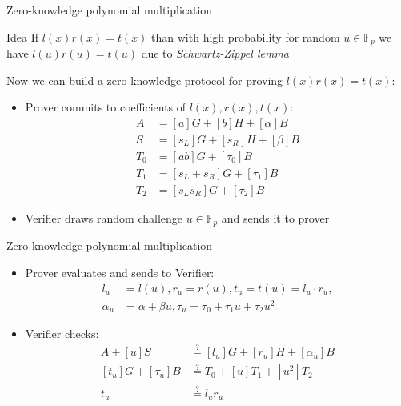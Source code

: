 \documentclass{zkdl-presentation-template}
\begin{document}
\begin{frame}{Zero-knowledge polynomial multiplication}
    \begin{block}{Idea}
        If $l(x)r(x) = t(x)$ than with high probability for random $u \in \mathbb{F}_p$ we have $l(u)r(u) = t(u)$ due to \textit{Schwartz-Zippel lemma}
    \end{block}
    Now we can build a zero-knowledge protocol for proving $l(x)r(x) = t(x)$:
    \begin{itemize}
        \item Prover commits to coefficients of $l(x), r(x), t(x)$:
            \begin{align*}
                A &= [a]G + [b]H + [\alpha]B\\
                S &= [s_L]G + [s_R]H + [\beta]B\\
                T_0 &= [ab]G + [\tau_0]B \\
                T_1 &= [s_L + s_R]G + [\tau_1]B \\
                T_2 &= [s_Ls_R]G + [\tau_2]B
            \end{align*}
        \item Verifier draws random challenge $u \in \mathbb{F}_p$ and sends it to prover
    \end{itemize}
\end{frame}

\begin{frame}{Zero-knowledge polynomial multiplication}
    \begin{itemize}
        \item Prover evaluates and sends to Verifier: 
        \begin{align*}
            l_u &=l(u), r_u = r(u), t_u = t(u) = l_u \cdot r_u, \\
            \alpha_u &= \alpha + \beta u, \tau_u = \tau_0 + \tau_1 u + \tau_2 u^2
        \end{align*}
        \item Verifier checks:
        \begin{align*}
            A + [u]S &\stackrel{?}{=} [l_u]G + [r_u]H + [\alpha_u]B \\
            [t_u]G + [\tau_u]B &\stackrel{?}{=} T_0 + [u]T_1 + [u^2]T_2 \\
            t_u &\stackrel{?}{=} l_u r_u
        \end{align*}
    \end{itemize}
\end{frame}
\end{document}
